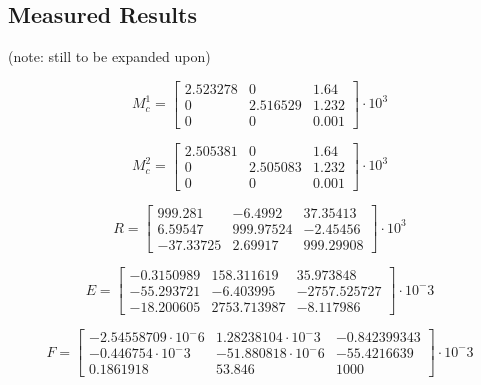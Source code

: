\subsection{Measured Results}

(note: still to be expanded upon)

\begin{equation}\label{eq::cm1}
M_c^1 = \begin{bmatrix}
2.523278 & 0 & 1.64 \\
0 & 2.516529 & 1.232 \\
0 & 0 & 0.001
\end{bmatrix}\cdot10^3
\end{equation}

\begin{equation}\label{eq::cm2}
M_c^2 = \begin{bmatrix}
2.505381 & 0 & 1.64 \\
0 & 2.505083 & 1.232 \\
0 & 0 & 0.001
\end{bmatrix}\cdot10^3
\end{equation}

\begin{equation}\label{eq::R}
R = \begin{bmatrix}
999.281 & -6.4992 & 37.35413 \\
6.59547 & 999.97524 & -2.45456 \\
-37.33725 & 2.69917 & 999.29908
\end{bmatrix}\cdot10^3
\end{equation}

\begin{equation}\label{eq::E}
E = \begin{bmatrix}
-0.3150989 & 158.311619 & 35.973848 \\
-55.293721 & -6.403995 & -2757.525727 \\
-18.200605 & 2753.713987 & -8.117986
\end{bmatrix}\cdot10^-3
\end{equation}

\begin{equation}\label{eq::F}
F = \begin{bmatrix}
-2.54558709\cdot10^-6 & 1.28238104\cdot10^-3 & -0.842399343\\
-0.446754\cdot10^-3 & -51.880818\cdot10^-6 & -55.4216639\\
0.1861918 & 53.846 & 1000
\end{bmatrix}\cdot10^-3
\end{equation}

